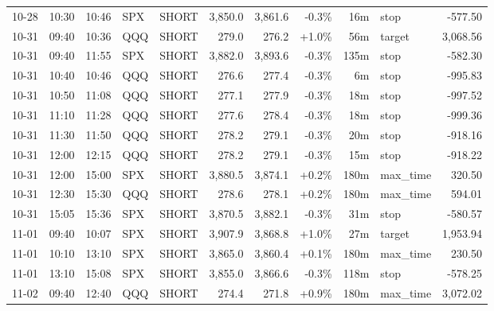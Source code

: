 \documentclass[11pt,a4paper,twoside]{article}
\begin{document}
\begin{center}
\begin{longtable}{>{\color{txtmain}}l l l l l r r r r >{\color{txtmain}}l r}
10-28 & 10:30 & 10:46 & SPX & SHORT & 3,850.0 & 3,861.6 & \textcolor{lossred}{-0.3\%} & 16m & stop & \textcolor{lossred}{-577.50} \\
10-31 & 09:40 & 10:36 & QQQ & SHORT & 279.0 & 276.2 & \textcolor{wingreen}{+1.0\%} & 56m & target & \textcolor{wingreen}{3,068.56} \\
10-31 & 09:40 & 11:55 & SPX & SHORT & 3,882.0 & 3,893.6 & \textcolor{lossred}{-0.3\%} & 135m & stop & \textcolor{lossred}{-582.30} \\
10-31 & 10:40 & 10:46 & QQQ & SHORT & 276.6 & 277.4 & \textcolor{lossred}{-0.3\%} & 6m & stop & \textcolor{lossred}{-995.83} \\
10-31 & 10:50 & 11:08 & QQQ & SHORT & 277.1 & 277.9 & \textcolor{lossred}{-0.3\%} & 18m & stop & \textcolor{lossred}{-997.52} \\
10-31 & 11:10 & 11:28 & QQQ & SHORT & 277.6 & 278.4 & \textcolor{lossred}{-0.3\%} & 18m & stop & \textcolor{lossred}{-999.36} \\
10-31 & 11:30 & 11:50 & QQQ & SHORT & 278.2 & 279.1 & \textcolor{lossred}{-0.3\%} & 20m & stop & \textcolor{lossred}{-918.16} \\
10-31 & 12:00 & 12:15 & QQQ & SHORT & 278.2 & 279.1 & \textcolor{lossred}{-0.3\%} & 15m & stop & \textcolor{lossred}{-918.22} \\
10-31 & 12:00 & 15:00 & SPX & SHORT & 3,880.5 & 3,874.1 & \textcolor{wingreen}{+0.2\%} & 180m & max\_time & \textcolor{wingreen}{320.50} \\
10-31 & 12:30 & 15:30 & QQQ & SHORT & 278.6 & 278.1 & \textcolor{wingreen}{+0.2\%} & 180m & max\_time & \textcolor{wingreen}{594.01} \\
10-31 & 15:05 & 15:36 & SPX & SHORT & 3,870.5 & 3,882.1 & \textcolor{lossred}{-0.3\%} & 31m & stop & \textcolor{lossred}{-580.57} \\
11-01 & 09:40 & 10:07 & SPX & SHORT & 3,907.9 & 3,868.8 & \textcolor{wingreen}{+1.0\%} & 27m & target & \textcolor{wingreen}{1,953.94} \\
11-01 & 10:10 & 13:10 & SPX & SHORT & 3,865.0 & 3,860.4 & \textcolor{wingreen}{+0.1\%} & 180m & max\_time & \textcolor{wingreen}{230.50} \\
11-01 & 13:10 & 15:08 & SPX & SHORT & 3,855.0 & 3,866.6 & \textcolor{lossred}{-0.3\%} & 118m & stop & \textcolor{lossred}{-578.25} \\
11-02 & 09:40 & 12:40 & QQQ & SHORT & 274.4 & 271.8 & \textcolor{wingreen}{+0.9\%} & 180m & max\_time & \textcolor{wingreen}{3,072.02} \\

\end{longtable}
\end{center}
\end{document}
